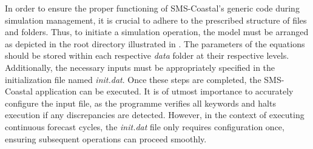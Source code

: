 In order to ensure the proper functioning of SMS-Coastal's generic code during simulation management, it is crucial to adhere to the prescribed structure of files and folders. Thus, to initiate a simulation operation, the model must be arranged as depicted in the root directory illustrated in . The parameters of the equations should be stored within each respective \emph{data} folder at their respective levels. Additionally, the necessary inputs must be appropriately specified in the initialization file named \emph{init.dat}. Once these steps are completed, the SMS-Coastal application can be executed. It is of utmost importance to accurately configure the input file, as the programme verifies all keywords and halts execution if any discrepancies are detected. However, in the context of executing continuous forecast cycles, the \emph{init.dat} file only requires configuration once, ensuring subsequent operations can proceed smoothly.

\vspace{20mm}


